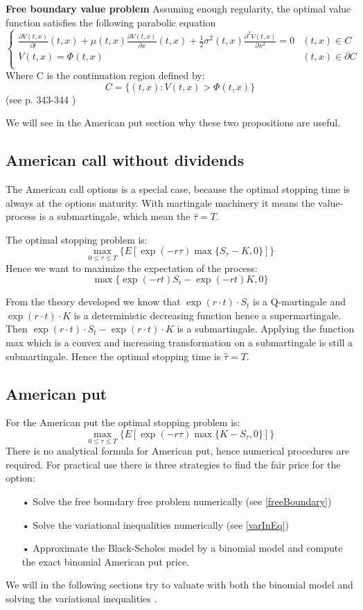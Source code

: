 \begin{proposition}{\textbf{Free boundary value problem}}\label{freeBoundary}
Assuming enough regularity, the optimal value function satisfies the following parabolic equation
\[ \begin{cases} 
      \frac{\partial V(t,x)}{\partial t}(t,x) + \mu(t,x) \frac{\partial V(t,x)}{\partial x}(t,x) + \frac{1}{2}\sigma^2(t,x)\frac{\partial^2 V(t,x)}{\partial x^2}=0 & (t,x)\in C \\
     V(t,x)=\Phi(t,x)  & (t,x)\in \partial C \\
   \end{cases}
\]
Where C is the continuation region defined by:
$$C=\{(t,x): V(t,x)>\Phi(t,x) \}$$
(see p. 343-344 \parencite{finKont})
\end{proposition}

We will see in the American put section why these two propositions are useful.

\subsection{American call without dividends}
The American call options is a special case, because the optimal stopping time is always at the options maturity. With martingale machinery it means the value-process is a submartingale, which mean the $\hat{\tau}=T$.

The optimal stopping problem is:
$$\max_{0 \leq \tau\leq T}\{E[\exp(-r \tau) \max\{S_{\tau} - K, 0\}]\}$$
Hence we want to maximize the expectation of the process:
$$ \max\{ \exp(-r t) S_{t} - \exp(-r t) K, 0 \}$$

From the theory developed we know that $\exp(r\cdot t) \cdot S_t$ is a Q-martingale and $\exp(r\cdot t) \cdot K$ is a deterministic decreasing function hence a supermartingale. Then $\exp(r\cdot t) \cdot S_t - \exp(r\cdot t) \cdot K$ is a submartingale. Applying the function max which is a convex and increasing transformation on a submartingale is still a submartingale. Hence the optimal stopping time is $\hat{\tau}=T$.

\subsection{American put}
For the American put the optimal stopping problem is:
$$\max_{0 \leq \tau\leq T}\{E[\exp(-r \tau) \max\{K - S_{\tau}, 0\}]\}$$
There is no analytical formula for American put, hence numerical procedures are required. For practical use there is three strategies to find the fair price for the option:
\begin{enumerate}
\item[•] Solve the free boundary free problem numerically (see \ref{freeBoundary})
\item[•] Solve the variational inequalities numerically (see \ref{varInEq})
\item[•] Approximate the Black-Scholes model by a binomial model and compute the exact binomial American put price.
\end{enumerate}
We will in the following sections try to valuate with both the binomial model and solving the variational inequalities \parencite{finKont}.